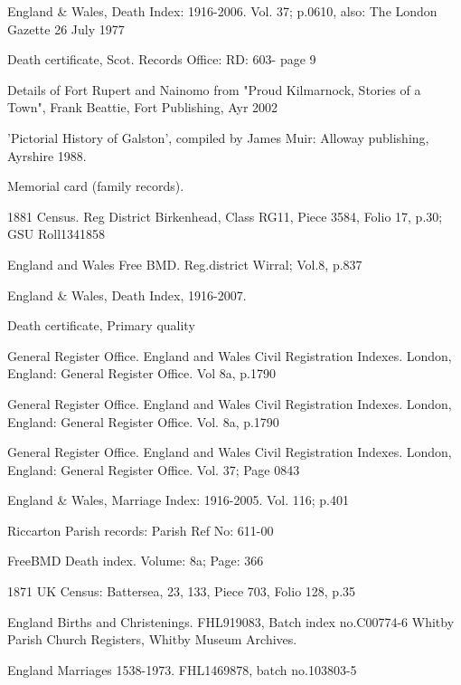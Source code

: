 \begin{thebibliography}{99}
	England \& Wales, Death Index: 1916-2006. Vol. 37; p.0610, also:
	The London Gazette 26 July 1977

	Death certificate, Scot. Records Office: RD: 603- page 9

	Details of Fort Rupert and Nainomo from "Proud Kilmarnock, Stories of a Town", Frank Beattie, Fort Publishing, Ayr 2002

	'Pictorial History of Galston', compiled by James Muir: Alloway publishing, Ayrshire 1988.

	 Memorial card (family records).
	 
	1881 Census. Reg District Birkenhead, Class RG11, Piece 3584, Folio 17, p.30; GSU Roll1341858
	
	England and Wales Free BMD. Reg.district Wirral; Vol.8, p.837
	
	England \& Wales, Death Index, 1916-2007.
	
	Death certificate, Primary quality
	
	General Register Office. England and Wales Civil Registration Indexes. London, England: General Register 		Office. Vol 8a, p.1790

	General Register Office. England and Wales Civil Registration Indexes. London, England: General Register 		Office. Vol. 8a, p.1790
	
	General Register Office. England and Wales Civil Registration Indexes. London, England: General Register 		Office. Vol. 37; Page 0843
	
	England \& Wales, Marriage Index: 1916-2005. Vol. 116; p.401

	Riccarton Parish records: Parish Ref No: 611-00
	
	FreeBMD Death index. Volume: 8a; Page: 366
	
	1871 UK Census: Battersea, 23, 133, Piece 703, Folio 128, p.35 
	
	 England Births and Christenings. FHL919083, Batch index no.C00774-6
	 Whitby Parish Church Registers, Whitby Museum Archives.
	 
	England Marriages 1538-1973. FHL1469878, batch no.103803-5


\end{thebibliography}
